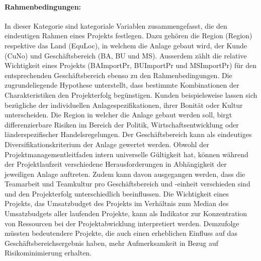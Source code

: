 \paragraph{Rahmenbedingungen:} In dieser Kategorie sind kategoriale Variablen zusammengefasst, die den eindeutigen Rahmen eines Projekts festlegen. Dazu gehören die Region (Region) respektive das Land (EquLoc), in welchem die Anlage gebaut wird, der Kunde (CuNo) und Geschäftsbereich (BA, BU und MS). Ausserdem zählt die relative Wichtigkeit eines Projekts (BAImportPr, BUImportPr und MSImportPr) für den entsprechenden Geschäftsbereich ebenso zu den Rahmenbedingungen. Die zugrundeliegende Hypothese unterstellt, dass bestimmte Kombinationen der Charakteristiken den Projekterfolg begünstigen. Kunden beispielsweise lassen sich bezügliche der individuellen Anlagespezifikationen, ihrer Bonität oder Kultur unterscheiden. Die Region in welcher die Anlage gebaut werden soll, birgt differenzierbare Risiken im Bereich der Politik, Wirtschaftsentwicklung oder länderspezifischer Handelsregelungen. Der Geschäftsbereich kann als eindeutiges Diversifikationskriterium der Anlage gewertet werden. Obwohl der Projektmanagementleitfaden intern universelle Gültigkeit hat, können während der Projektlaufzeit verschiedene Herausforderungen in Abhängigkeit der jeweiligen Anlage auftreten. Zudem kann davon ausgegangen werden, dass die Teamarbeit und Teamkultur pro Geschäftsbereich und -einheit verschieden sind und den Projekterfolg unterschiedlich beeinflussen. Die Wichtigkeit eines Projekts, das Umsatzbudget des Projekts im Verhältnis zum Median des Umsatzbudgets aller laufenden Projekte, kann als Indikator zur Konzentration von Ressourcen bei der Projektabwicklung interpretiert werden. Demzufolge müssten bedeutendere Projekte, die auch einen erheblichen Einfluss auf das Geschäftsbereichsergebnis haben, mehr Aufmerksamkeit in Bezug auf Risikominimierung erhalten.
